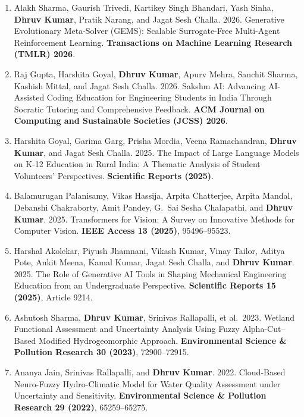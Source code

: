 \documentclass[10pt, a4paper]{article}
\begin{document}
\begin{enumerate}[label=\textbf{J\arabic*.}, leftmargin=2.8em, itemsep=0.3em]

\item Alakh Sharma, Gaurish Trivedi, Kartikey Singh Bhandari, Yash Sinha, \textbf{Dhruv Kumar}, Pratik Narang, and Jagat Sesh Challa. 2026. Generative Evolutionary Meta-Solver (GEMS): Scalable Surrogate-Free Multi-Agent Reinforcement Learning. \textbf{Transactions on Machine Learning Research (TMLR) 2026}.

\item Raj Gupta, Harshita Goyal, \textbf{Dhruv Kumar}, Apurv Mehra, Sanchit Sharma, Kashish Mittal, and Jagat Sesh Challa. 2026. Sakshm AI: Advancing AI-Assisted Coding Education for Engineering Students in India Through Socratic Tutoring and Comprehensive Feedback. \textbf{ACM Journal on Computing and Sustainable Societies (JCSS) 2026}.

\item Harshita Goyal, Garima Garg, Prisha Mordia, Veena Ramachandran, \textbf{Dhruv Kumar}, and Jagat Sesh Challa. 2025. The Impact of Large Language Models on K-12 Education in Rural India: A Thematic Analysis of Student Volunteers' Perspectives. \textbf{Scientific Reports (2025)}.

\item Balamurugan Palanisamy, Vikas Hassija, Arpita Chatterjee, Arpita Mandal, Debanshi Chakraborty, Amit Pandey, G.\ Sai Sesha Chalapathi, and \textbf{Dhruv Kumar}. 2025. Transformers for Vision: A Survey on Innovative Methods for Computer Vision. \textbf{IEEE Access 13 (2025)}, 95496--95523.

\item Harshal Akolekar, Piyush Jhamnani, Vikash Kumar, Vinay Tailor, Aditya Pote, Ankit Meena, Kamal Kumar, Jagat Sesh Challa, and \textbf{Dhruv Kumar}. 2025. The Role of Generative AI Tools in Shaping Mechanical Engineering Education from an Undergraduate Perspective. \textbf{Scientific Reports 15 (2025)}, Article 9214.

\item Ashutosh Sharma, \textbf{Dhruv Kumar}, Srinivas Rallapalli, et al.\ 2023. Wetland Functional Assessment and Uncertainty Analysis Using Fuzzy Alpha-Cut--Based Modified Hydrogeomorphic Approach. \textbf{Environmental Science \& Pollution Research 30 (2023)}, 72900--72915.

\item Ananya Jain, Srinivas Rallapalli, and \textbf{Dhruv Kumar}. 2022. Cloud-Based Neuro-Fuzzy Hydro-Climatic Model for Water Quality Assessment under Uncertainty and Sensitivity. \textbf{Environmental Science \& Pollution Research 29 (2022)}, 65259--65275.


\end{enumerate}
\end{document}
